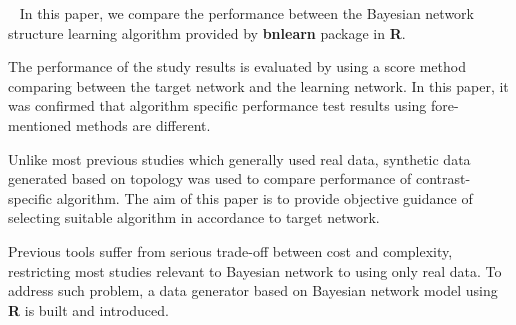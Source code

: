 \vspace{1cm} {\small \ \indent
In this paper, we compare the performance between the Bayesian network structure learning algorithm provided by \textbf{bnlearn} package in \textbf{R}.

The performance of the study results is evaluated by using a score method comparing between the target network and the learning network. In this paper, it was confirmed that algorithm specific performance test results using fore-mentioned methods are different.

Unlike most previous studies which generally used real data, synthetic data generated based on topology was used to compare performance of contrast-specific algorithm. The aim of this paper is to provide objective guidance of selecting suitable algorithm in accordance to target network.

Previous tools suffer from serious trade-off between cost and complexity, restricting most studies relevant to Bayesian network to using only real data. To address such problem, a data generator based on Bayesian network model using \textbf{R} is built and introduced.
} 
